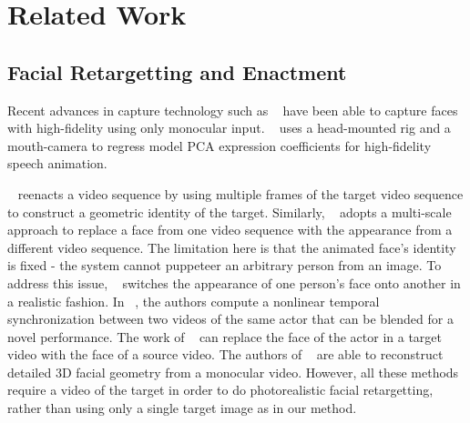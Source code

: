 \section{Related Work}




\subsection{Facial Retargetting and Enactment}
Recent advances in capture technology such as ~\cite{cao2015real,f2f,laine2016facial} have been able to capture faces with high-fidelity using only monocular input. 
~\cite{olszewski2016high} uses a head-mounted rig and a mouth-camera to regress model PCA expression coefficients for high-fidelity speech animation.  

~\cite{f2f} reenacts a video sequence by using multiple frames of the target video sequence to construct a geometric identity of the target. 
Similarly, ~\cite{rewrite} adopts a multi-scale approach to replace a face from one video sequence with the appearance from a different video sequence. 
The limitation here is that the animated face's identity is fixed - the system cannot puppeteer an arbitrary person from an image. To address this issue, ~\cite{replace} switches the appearance of one person's face onto another in a realistic fashion. In ~\cite{malleson2015facedirector}, the authors compute a nonlinear temporal synchronization between two videos of the same actor that can be blended for a novel performance. The work of ~\cite{garrido2014automatic} can replace the face of the actor in a target video with the face of a source video. The authors of ~\cite{garrido2013reconstructing} are able to reconstruct detailed 3D facial geometry from a monocular video.  
However, all these methods require a video of the target in order to do photorealistic facial retargetting, rather than using only a single target image as in our method.

